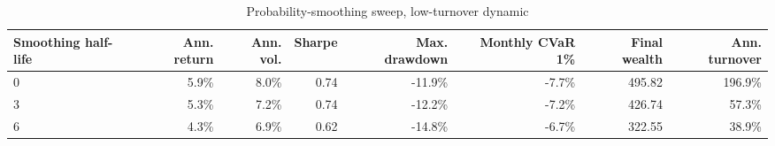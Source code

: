 ﻿\begin{table}[H]
\centering
\caption{Probability-smoothing sweep, low-turnover dynamic}
\label{tab:allocation-smoothing-low-turnover}
\small
\begin{adjustbox}{max width=\linewidth}
\begin{tabular}{lrrrrrrr}
\toprule
Smoothing half-life & Ann. return & Ann. vol. & Sharpe & Max. drawdown & Monthly CVaR 1\% & Final wealth & Ann. turnover \\
\midrule
0 & 5.9\% & 8.0\% & 0.74 & -11.9\% & -7.7\% & 495.82 & 196.9\% \\
3 & 5.3\% & 7.2\% & 0.74 & -12.2\% & -7.2\% & 426.74 & 57.3\% \\
6 & 4.3\% & 6.9\% & 0.62 & -14.8\% & -6.7\% & 322.55 & 38.9\% \\
\bottomrule
\end{tabular}
\end{adjustbox}
\end{table}



